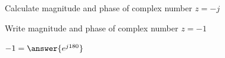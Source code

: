 \documentclass{ximera}
\begin{document}
\begin{example}
\begin{explanation}
\begin{image}
\end{image}


\end{explanation}


\end{example}


\begin{question}
Calculate magnitude and phase of 
complex number $z=-j$ 
\begin{multipleChoice}  
\end{multipleChoice}
\end{question}
  
  
  
  
  
  
  
  
  
  
  
  
  
  
  
  
  
  
  
  
  
  
  
  Write magnitude and phase of complex number $z=-1$
\begin{question}  
         $ -1 =  \answer{e^{j180}}$  
    \end{question} 
    
    
    
    
    
    
    
    
    
    
    
    
    
    
    
    
    
    
    
\end{document}
